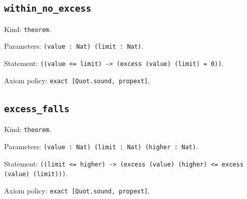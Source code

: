 \documentclass[11pt]{article}
\begin{document}
\subsection*{\texttt{within\_no\_excess}}
\noindent Kind: \texttt{theorem}.\par
\noindent Parameters: \texttt{(value : Nat) (limit : Nat)}.\par
\noindent Statement: \texttt{((value <= limit) -> (excess (value) (limit) = 0))}.\par
\noindent Axiom policy: \texttt{exact [Quot.sound, propext]}.\par
\subsection*{\texttt{excess\_falls}}
\noindent Kind: \texttt{theorem}.\par
\noindent Parameters: \texttt{(value : Nat) (limit : Nat) (higher : Nat)}.\par
\noindent Statement: \texttt{((limit <= higher) -> (excess (value) (higher) <= excess (value) (limit)))}.\par
\noindent Axiom policy: \texttt{exact [Quot.sound, propext]}.\par
\end{document}
